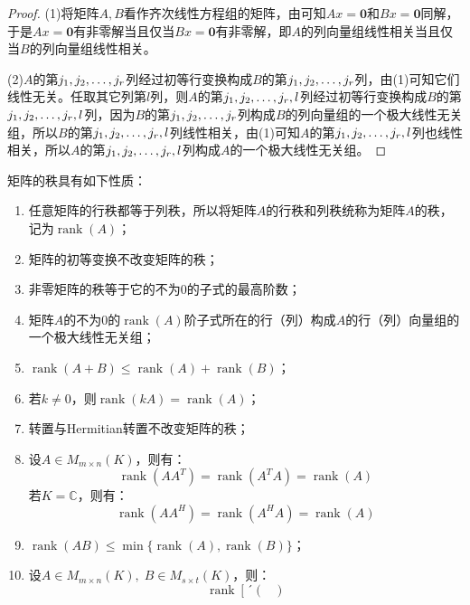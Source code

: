 \begin{proof}
	(1)将矩阵$A,B$看作齐次线性方程组的矩阵，由可知$Ax=\mathbf{0}$和$Bx=\mathbf{0}$同解，于是$Ax=\mathbf{0}$有非零解当且仅当$Bx=\mathbf{0}$有非零解，即$A$的列向量组线性相关当且仅当$B$的列向量组线性相关。\par
	(2)$A$的第$j_1, j_2, \dots, j_{r}$列经过初等行变换构成$B$的第$j_1, j_2, \dots, j_{r}$列，由(1)可知它们线性无关。任取其它列第$l$列，则$A$的第$j_1, j_2, \dots, j_{r},l$列经过初等行变换构成$B$的第$j_1, j_2, \dots, j_{r},l$列，因为$B$的第$j_1, j_2, \dots, j_{r}$列构成$B$的列向量组的一个极大线性无关组，所以$B$的第$j_1, j_2, \dots, j_{r},l$列线性相关，由(1)可知$A$的第$j_1, j_2, \dots, j_{r},l$列也线性相关，所以$A$的第$j_1, j_2, \dots, j_{r},l$列构成$A$的一个极大线性无关组。
\end{proof}
\begin{property}\label{prop:MatrixRank}
	矩阵的秩具有如下性质：
	\begin{enumerate}
		\item 任意矩阵的行秩都等于列秩，所以将矩阵$A$的行秩和列秩统称为矩阵$A$的秩，记为$\operatorname{rank}(A)$；
		\item 矩阵的初等变换不改变矩阵的秩；
		\item 非零矩阵的秩等于它的不为$0$的子式的最高阶数；
		\item 矩阵$A$的不为$0$的$\operatorname{rank}(A)$阶子式所在的行（列）构成$A$的行（列）向量组的一个极大线性无关组；
		\item $\operatorname{rank}(A+B)\leqslant\operatorname{rank}(A)+\operatorname{rank}(B)$；
		\item 若$k\ne0$，则$\operatorname{rank}(kA)=\operatorname{rank}(A)$；
		\item 转置与Hermitian转置不改变矩阵的秩；
		\item 设$A\in M_{m\times n}(K)$，则有：
		\begin{equation*}
			\operatorname{rank}(AA^T)=\operatorname{rank}(A^TA)=\operatorname{rank}(A)
		\end{equation*}
		若$K=\mathbb{C}$，则有：
		\begin{equation*}
			\operatorname{rank}(AA^H)=\operatorname{rank}(A^HA)=\operatorname{rank}(A)
		\end{equation*}
		\item $\operatorname{rank}(AB)\leqslant\min\{\operatorname{rank}(A),\operatorname{rank}(B)\}$；
		\item 设$A\in M_{m\times n}(K),\;B\in M_{s\times t}(K)$，则：
		\begin{equation*}
			\operatorname{rank}\left[
			´\begin{pmatrix}

\end{pmatrix}
\end{equation*}
\end{enumerate}
\end{property}
